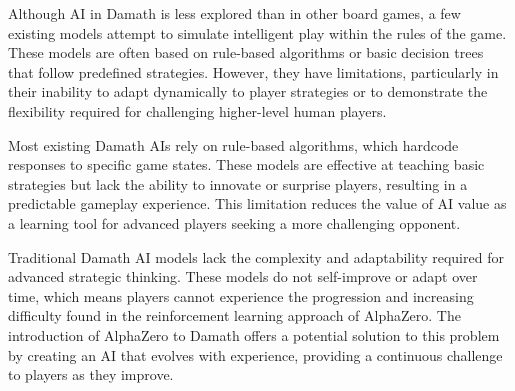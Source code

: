 Although AI in Damath is less explored than in other board games, a few existing models attempt to simulate intelligent play within the rules of the game. These models are often based on rule-based algorithms or basic decision trees that follow predefined strategies. However, they have limitations, particularly in their inability to adapt dynamically to player strategies or to demonstrate the flexibility required for challenging higher-level human players.

Most existing Damath AIs rely on rule-based algorithms, which hardcode responses to specific game states. These models are effective at teaching basic strategies but lack the ability to innovate or surprise players, resulting in a predictable gameplay experience. This limitation reduces the value of AI value as a learning tool for advanced players seeking a more challenging opponent.

Traditional Damath AI models lack the complexity and adaptability required for advanced strategic thinking. These models do not self-improve or adapt over time, which means players cannot experience the progression and increasing difficulty found in the reinforcement learning approach of AlphaZero. The introduction of AlphaZero to Damath offers a potential solution to this problem by creating an AI that evolves with experience, providing a continuous challenge to players as they improve.
